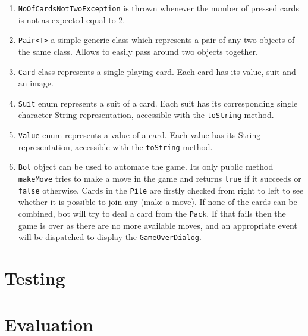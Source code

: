 \documentclass[a4paper, 12pt, titlepage]{article}
\begin{document}
\begin{enumerate}
	\item \texttt{NoOfCardsNotTwoException} is thrown whenever the number of pressed 
		cards is not as expected equal to 2. 
	
	\item \texttt{Pair<T>} a simple generic class which represents a pair of any two 
		objects of the same class. Allows to easily pass around two objects together.

	\item \texttt{Card} class represents a single playing card. Each card has its value, 
		suit and an image.
	
	\item \texttt{Suit} enum represents a suit of a card. Each suit has its corresponding
		single character String representation, accessible with the \texttt{toString} 
		method.
	
	\item \texttt{Value} enum represents a value of a card. Each value has its String 
		representation, accessible with the \texttt{toString} method.

	\item \texttt{Bot} object can be used to automate the game. Its only public method
		\texttt{makeMove} tries to make a move in the game and returns \texttt{true} if
		it succeeds or \texttt{false} otherwise. Cards in the \texttt{Pile} are firstly 
		checked from right to left to see whether it is possible to join any (make a 
		move). If none of the cards can be combined, bot will try to deal a card from 
		the \texttt{Pack}. If that fails then the game is over as there are no more
		available moves, and an appropriate event will be dispatched to display the
		\texttt{GameOverDialog}.
	
\end{enumerate}

\section{Testing}

\section{Evaluation}
\end{document}
